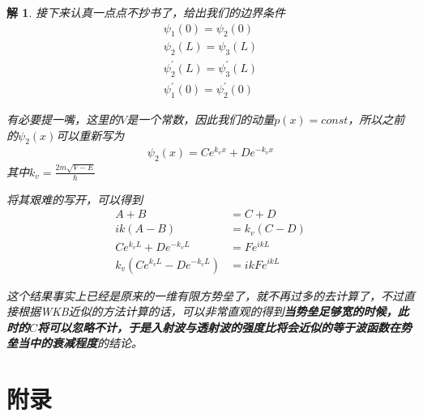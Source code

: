 \documentclass{article}
\newtheorem{solution}{解}
\begin{document}
\begin{solution}
    接下来认真一点点不抄书了，给出我们的边界条件
    \begin{align*}
        \psi_1(0)=\psi_2(0)\\
        \psi_2(L)=\psi_3(L)\\
        \psi_2^\prime(L)=\psi_3^\prime(L)\\
        \psi_1^\prime(0)=\psi_2^\prime(0)
    \end{align*}

    有必要提一嘴，这里的$V$是一个常数，因此我们的动量$p(x)=const$，所以之前的$\psi_2(x)$可以重新写为
    \begin{align*}
        \psi_2(x)=Ce^{k_vx}+De^{-k_vx}
    \end{align*}
    其中$\displaystyle k_v=\frac{2m\sqrt{V-E}}{\hbar}$

    将其艰难的写开，可以得到
    \begin{align*}
        A+B&=C+D\\
        ik(A-B)&=k_v(C-D)\\
        Ce^{k_vL}+De^{-k_vL}&=Fe^{ikL}\\
        k_v(Ce^{k_vL}-De^{-k_vL})&=ikFe^{ikL}
    \end{align*}

    这个结果事实上已经是原来的一维有限方势垒了，就不再过多的去计算了，不过直接根据WKB近似的方法计算的话，可以非常直观的得到\textbf{当势垒足够宽的时候，此时的$C$将可以忽略不计，于是入射波与透射波的强度比将会近似的等于波函数在势垒当中的衰减程度}的结论。
\end{solution}
























\newpage
\section{附录}
\end{document}
